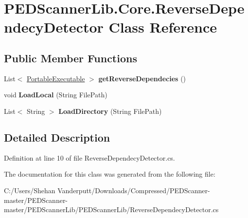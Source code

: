 \hypertarget{class_p_e_d_scanner_lib_1_1_core_1_1_reverse_dependecy_detector}{}\section{P\+E\+D\+Scanner\+Lib.\+Core.\+Reverse\+Dependecy\+Detector Class Reference}
\label{class_p_e_d_scanner_lib_1_1_core_1_1_reverse_dependecy_detector}
\subsection*{Public Member Functions}
\begin{DoxyCompactItemize}
\item 
\mbox{\label{class_p_e_d_scanner_lib_1_1_core_1_1_reverse_dependecy_detector_aa07cd53fcf0e69799968d520b4262669}} 
List$<$ \mbox{\hyperlink{class_p_e_d_scanner_lib_1_1_core_1_1_portable_executable}{Portable\+Executable}} $>$ {\bfseries get\+Reverse\+Dependecies} ()
\item 
\mbox{\label{class_p_e_d_scanner_lib_1_1_core_1_1_reverse_dependecy_detector_a346c2f32223cd5cd6cc5f4f369d71811}} 
void {\bfseries Load\+Local} (String File\+Path)
\item 
\mbox{\label{class_p_e_d_scanner_lib_1_1_core_1_1_reverse_dependecy_detector_ab0f6748086636681958df557f3ef7c51}} 
List$<$ String $>$ {\bfseries Load\+Directory} (String File\+Path)
\end{DoxyCompactItemize}


\subsection{Detailed Description}


Definition at line 10 of file Reverse\+Dependecy\+Detector.\+cs.



The documentation for this class was generated from the following file\+:\begin{DoxyCompactItemize}
\item 
C\+:/\+Users/\+Shehan Vanderputt/\+Downloads/\+Compressed/\+P\+E\+D\+Scanner-\/master/\+P\+E\+D\+Scanner-\/master/\+P\+E\+D\+Scanner\+Lib/\+P\+E\+D\+Scanner\+Lib/Reverse\+Dependecy\+Detector.\+cs\end{DoxyCompactItemize}
